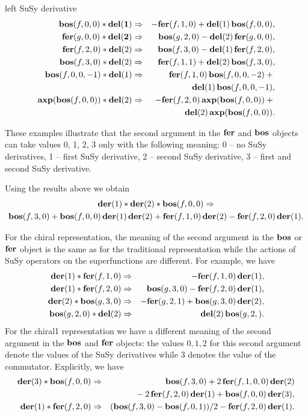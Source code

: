 {\begin{description}
\item{left SuSy derivative}
  \begin{eqnarray*}
    \mathbf{bos}(f,0,0)*\mathbf{\mathbf{del}(1)} &\Rightarrow& -\mathbf{fer}(f,1,0)+\mathbf{del}(1)\,\mathbf{bos}(f,0,0), \\
    \mathbf{fer}(g,0,0)*\mathbf{\mathbf{del}(2)} &\Rightarrow&  \mathbf{bos}(g,2,0)-\mathbf{del}(2)\,\mathbf{fer}(g,0,0), \\
    \mathbf{fer}(f,2,0)*\mathbf{del}(2) &\Rightarrow& \mathbf{bos}(f,3,0)-\mathbf{del}(1)\,\mathbf{fer}(f,2,0), \\
    \mathbf{bos}(f,3,0)*\mathbf{del}(2) &\Rightarrow& \mathbf{fer}(f,1,1)+\mathbf{del}(2)\,\mathbf{bos}(f,3,0), \\
    \mathbf{bos}(f,0,0,-1)*\mathbf{del}(1) &\Rightarrow& \mathbf{fer}(f,1,0)\,\mathbf{bos}(f,0,0,-2) + \mbox{}\\
    && \mathbf{del}(1)\,\mathbf{bos}(f,0,0,-1), \\
    \mathbf{axp}(\mathbf{bos}(f,0,0))*\mathbf{del}(2) &\Rightarrow&
    -\mathbf{fer}(f,2,0)\,\mathbf{axp}(\mathbf{bos}(f,0,0)) + \mbox{}\\
    && \mathbf{del}(2)\,\mathbf{axp}(\mathbf{bos}(f,0,0)).
  \end{eqnarray*}
\end{description}

These examples illustrate that the second argument in the $\mathbf{fer}$ and
$\mathbf{bos}$ objects can take values 0, 1, 2, 3 only with the following
meaning: 0 -- no SuSy derivatives, 1 -- first SuSy derivative, 2 --
second SuSy derivative, 3 -- first and second SuSy derivative.

Using the results above we obtain
\begin{multline*}
  \mathbf{der}(1)*\mathbf{der}(2)*\mathbf{bos}(f,0,0) \Rightarrow \\
  \mathbf{bos}(f,3,0) + \mathbf{bos}(f,0,0)\,\mathbf{der}(1)\,\mathbf{der}(2) +
  \mathbf{fer}(f,1,0)\,\mathbf{der}(2) - \mathbf{fer}(f,2,0)\,\mathbf{der}(1).
\end{multline*}

For the chiral representation, the meaning of the second argument in
the $\mathbf{bos}$ or $\mathbf{fer}$ object is the same as for the traditional
representation while the actions of SuSy operators on the
superfunctions are different.  For example, we have
\begin{eqnarray*}
  \mathbf{der}(1)*\mathbf{fer}(f,1,0) &\Rightarrow& -\mathbf{fer}(f,1,0)\,\mathbf{der}(1), \\
  \mathbf{der}(1)*\mathbf{fer}(f,2,0) &\Rightarrow& \mathbf{bos}(g,3,0) - \mathbf{fer}(f,2,0)\,\mathbf{der}(1), \\
  \mathbf{der}(2)*\mathbf{bos}(g,3,0) &\Rightarrow& -\mathbf{fer}(g,2,1) + \mathbf{bos}(g,3,0)\,\mathbf{der}(2), \\
  \mathbf{bos}(g,2,0)*\mathbf{del}(2) &\Rightarrow& \mathbf{del}(2)\,\mathbf{bos}(g,2,).
\end{eqnarray*}
For the chiral1 representation we have a different meaning of the
second argument in the $\mathbf{bos}$ and $\mathbf{fer}$ objects: the values $0,1,2$
for this second argument denote the values of the SuSy derivatives
while 3 denotes the value of the commutator.  Explicitly, we have
\begin{eqnarray*}
  \mathbf{der}(3)*\mathbf{bos}(f,0,0) &\Rightarrow& \mathbf{bos}(f,3,0) + 2\,\mathbf{fer}(f,1,0,0)\,\mathbf{der}(2) \\
  && \mbox{} - 2\,\mathbf{fer}(f,2,0)\,\mathbf{der}(1) + \mathbf{bos}(f,0,0)\,\mathbf{der}(3), \\
  \mathbf{der}(1)*\mathbf{fer}(f,2,0) &\Rightarrow& (\mathbf{bos}(f,3,0)-\mathbf{bos}(f,0,1))/2 - \mathbf{fer}(f,2,0)\,\mathbf{der}(1).
\end{eqnarray*}

}
